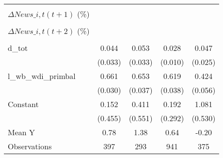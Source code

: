 {\begin{tabular}{l*{4}{c}}
                    &                     &                     &                     &                     \\
\addlinespace
$ \Delta News\_{i,t}(t+1)$ (\%)&                     &                     &                     &                     \\
                    &                     &                     &                     &                     \\
\addlinespace
$ \Delta News\_{i,t}(t+2)$ (\%)&                     &                     &                     &                     \\
                    &                     &                     &                     &                     \\
\addlinespace
d\_tot               &       0.044         &       0.053         &       0.028\sym{***}&       0.047\sym{*}  \\
                    &     (0.033)         &     (0.033)         &     (0.010)         &     (0.025)         \\
\addlinespace
l\_wb\_wdi\_primbal    &       0.661\sym{***}&       0.653\sym{***}&       0.619\sym{***}&       0.424\sym{***}\\
                    &     (0.030)         &     (0.037)         &     (0.038)         &     (0.056)         \\
\addlinespace
Constant            &       0.152         &       0.411         &       0.192         &       1.081\sym{*}  \\
                    &     (0.455)         &     (0.551)         &     (0.292)         &     (0.530)         \\
\midrule
Mean Y              &        0.78         &        1.38         &        0.64         &       -0.20         \\
Observations        &         397         &         293         &         941         &         375         \\
\bottomrule
\end{tabular}
}
